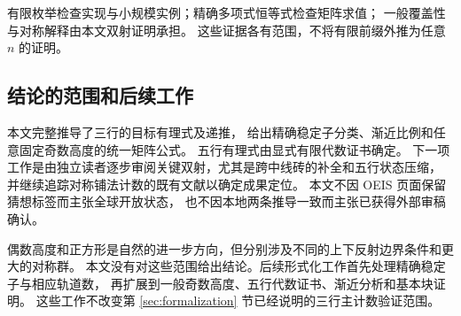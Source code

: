 有限枚举检查实现与小规模实例；精确多项式恒等式检查矩阵求值；
一般覆盖性与对称解释由本文双射证明承担。
这些证据各有范围，不将有限前缀外推为任意 $n$ 的证明。

\subsection{结论的范围和后续工作}
本文完整推导了三行的目标有理式及递推，
给出精确稳定子分类、渐近比例和任意固定奇数高度的统一矩阵公式。
五行有理式由显式有限代数证书确定。
下一项工作是由独立读者逐步审阅关键双射，尤其是跨中线砖的补全和五行状态压缩，
并继续追踪对称铺法计数的既有文献以确定成果定位。
本文不因 OEIS 页面保留猜想标签而主张全球开放状态，
也不因本地两条推导一致而主张已获得外部审稿确认。

偶数高度和正方形是自然的进一步方向，但分别涉及不同的上下反射边界条件和更大的对称群。
本文没有对这些范围给出结论。后续形式化工作首先处理精确稳定子与相应轨道数，
再扩展到一般奇数高度、五行代数证书、渐近分析和基本块证明。
这些工作不改变第 \ref{sec:formalization} 节已经说明的三行主计数验证范围。
